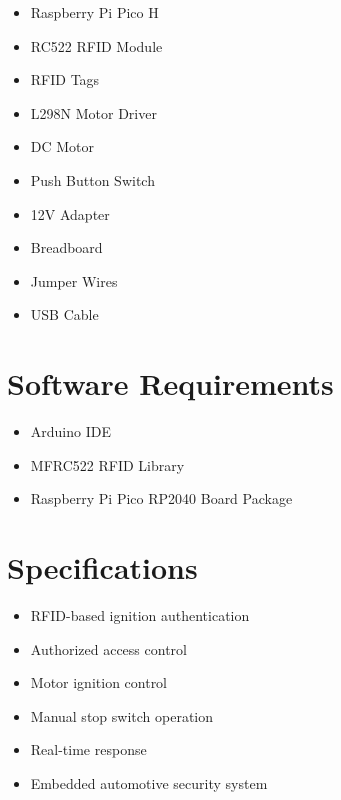 \documentclass[12pt,a4paper,oneside]{report}
\begin{document}
\begin{itemize}

\item Raspberry Pi Pico H

\item RC522 RFID Module

\item RFID Tags

\item L298N Motor Driver

\item DC Motor

\item Push Button Switch

\item 12V Adapter

\item Breadboard

\item Jumper Wires

\item USB Cable

\end{itemize}

\section{Software Requirements}

\begin{itemize}

\item Arduino IDE

\item MFRC522 RFID Library

\item Raspberry Pi Pico RP2040 Board Package

\end{itemize}

\section{Specifications}

\begin{itemize}

\item RFID-based ignition authentication

\item Authorized access control

\item Motor ignition control

\item Manual stop switch operation

\item Real-time response

\item Embedded automotive security system

\end{itemize}
\end{document}
